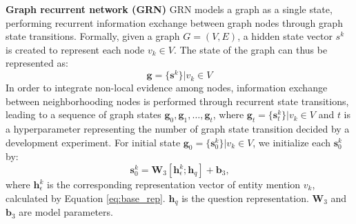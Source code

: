\documentclass[letterpaper]{article}
\begin{document}
\vspace{0.5em}
\textbf{Graph recurrent network (GRN)} 
GRN
models a graph as a single state, performing recurrent information exchange between graph nodes through graph state transitions.
Formally, given a graph $G=(V,E)$, a hidden state vector $s^k$ is created to represent each node $v_k \in V$.
The state of the graph can thus be represented as:
\[
\boldsymbol{g}=\{\boldsymbol{s}^k\}|v_k \in V
\]
In order to integrate non-local evidence among nodes, information exchange between neighborhooding nodes is performed through recurrent state transitions, leading to a sequence of graph states $\boldsymbol{g}_0, \boldsymbol{g}_1, \dots, \boldsymbol{g}_t$, where $\boldsymbol{g}_t=\{\boldsymbol{s}^k_t\}|v_k \in V$ and $t$ is a hyperparameter representing the number of graph state transition decided by a development experiment.
For initial state $\boldsymbol{g}_0=\{\boldsymbol{s}^k_0\}|v_k \in V$, we initialize each $\boldsymbol{s}^k_0$ by:
\begin{equation} \label{eq:init}
\boldsymbol{s}^k_0 = \boldsymbol{W}_3 [\boldsymbol{h}_\epsilon^k; \boldsymbol{h}_q] + \boldsymbol{b}_3 \textrm{,}
\end{equation}
where $\boldsymbol{h}_\epsilon^k$ is the corresponding representation vector of entity mention $v_k$, calculated by Equation \ref{eq:base_rep}. $\boldsymbol{h}_q$ is the question representation. $\boldsymbol{W}_3$ and $\boldsymbol{b}_3$ are model parameters.
\end{document}
